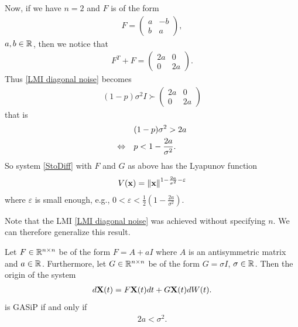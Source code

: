 \documentclass[a4paper,12pt,twoside,BCOR=10mm]{scrbook}
\begin{document}
Now, if we have $n = 2$ and $F$ is of the form
\begin{align*}
    F =
    \begin{pmatrix}
    a & -b\\
    b & a
    \end{pmatrix},
\end{align*}
$a,b \in \mathbb{R}^{}$, then we notice that
\begin{align*}
    F^T + F =
    \begin{pmatrix}
    2a & 0\\
    0 & 2a
    \end{pmatrix}.
\end{align*}
Thus \eqref{LMI diagonal noise} becomes
\begin{align*}
    (1 - p)\sigma^2 I \succ 
    \begin{pmatrix}
    2a & 0\\
    0 & 2a
    \end{pmatrix}
\end{align*}
that is
\begin{align*}
    &(1 - p)\sigma^2 > 2a\\
    \Leftrightarrow \quad& p < 1 - \frac{2a}{\sigma^2}.
\end{align*}
So system \eqref{StoDiff} with $F$ and $G$ as above has the Lyapunov function
\begin{align*}
    V(\mathbf{x}) = \left\lVert\mathbf{x}\right\rVert^{1 - \frac{2a}{\sigma^2} - \varepsilon}
\end{align*}
where $\varepsilon$ is small enough, e.g., $0 < \varepsilon < \frac{1}{2}\left(1 - \frac{2a}{\sigma^2}\right)$.

Note that the LMI \eqref{LMI diagonal noise} was achieved without specifying $n$. We can therefore generalize this result.
\fi
\begin{theorem}\label{ThmLyapunovFunc sI Fas n2 U1}
Let $F\in\mathbb{R}^{n\times n}$ be of the form $F = A + aI$ where $A$ is an antisymmetric matrix and $a \in \mathbb{R}^{}$. Furthermore, let $G \in \mathbb{R}^{n \times n}$ be of the form $G = \sigma I$, $\sigma\in \mathbb{R}^{}$. Then the origin of the system
\begin{align*}
    d\mathbf{X}(t) = F\mathbf{X}(t)dt + G\mathbf{X}(t)dW(t).
\end{align*}
is GASiP if and only if
\begin{align*}
2a < \sigma^2.
\end{align*}
\end{theorem}
\end{document}
